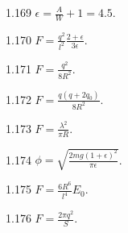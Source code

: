 \begin{Solution}{1.{169}}
	$\epsilon = \frac{A}{W} + 1 = 4.5$.
\end{Solution}
\begin{Solution}{1.{170}}
	$ F = \frac{q^2}{l^2} \frac{2 + \epsilon}{3\epsilon}.$
\end{Solution}
\begin{Solution}{1.{171}}
	$F = \frac{q^2}{8R^2}$.
\end{Solution}
\begin{Solution}{1.{172}}
	$F = \frac{q(q + 2q_0)}{8R^2}$.
\end{Solution}
\begin{Solution}{1.{173}}
	$F = \frac{\lambda^2}{\pi R}$.
\end{Solution}
\begin{Solution}{1.{174}}
	$\phi = \sqrt{\frac{2mg(1+\epsilon)^2}{\pi\epsilon}}$.
\end{Solution}
\begin{Solution}{1.{175}}
	$F = \frac{6R^6}{l^4} E_0$.
\end{Solution}
\begin{Solution}{1.{176}}
	$F = \frac{2\pi q^2}{S}$.
\end{Solution}
